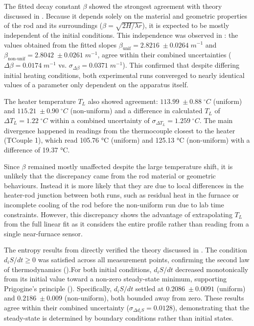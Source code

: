 \documentclass[11pt, a4paper, twocolumn]{article}
\begin{document}
The fitted decay constant $\beta$ showed the strongest agreement with theory discussed in . Because it depends solely on the material and geometric properties of the rod and its surroundings ($\beta=\sqrt{2H/\lambda r}$), it is expected to be mostly independent of the initial conditions. This independence was observed in : the values obtained from the fitted slopes $\beta_{\text{unif}} = 2.8216\;\pm 0.0264\; m^{-1}$ and $\beta_{\text{non-unif}} = 2.8042\;\pm 0.0261\; m^{-1}$, agree within their combined uncertainties ($\Delta \beta = 0.0174\;m^{-1}$ vs. $\sigma_{\Delta\beta}=0.0371\;m^{-1}$). This confirmed that despite differing initial heating conditions, both experimental runs convereged to nearly identical values of a parameter only dependent on the apparatus itself.

The heater temperature $T_L$ also showed agreement: $113.99\;\pm 0.88\; ^{\circ}C$ (uniform) and $115.21\;\pm 0.90\; ^{\circ}C$ (non-uniform) and a difference in calculated $T_L$ of $\Delta T_L = 1.22\;^{\circ}C$ within a combined uncertainty of $\sigma_{\Delta T_L}=1.259\;^{\circ}C$. The main divergence happened in readings from the thermocouple closest to the heater (TCouple 1), which read 105.76 °C (uniform) and 125.13 °C (non-uniform) with a difference of 19.37 °C.

Since $\beta$ remained mostly unaffected despite the large temperature shift, it is unlikely that the discrepancy came from the rod material or geometric behaviours. Instead it is more likely that they are due to local differences in the heater-rod junction between both runs, such as residual heat in the furnace or incomplete cooling of the rod before the non-uniform run due to lab time constraints. However, this discrepancy shows the advantage of extrapolating $T_L$ from the full linear fit as it considers the entire profile rather than reading from a single near-furnace sensor.

The entropy results from  directly verified the theory discussed in . The condition $d_iS/dt \ge 0$ was satisfied across all measurement points, confirming the second law of thermodynamics ().For both initial conditions, $d_iS/dt$ decreased monotonically from its initial value toward a non-zero steady-state minimum, supporting Prigogine's principle (). Specifically, $d_iS/dt$ settled at $0.2086\;\pm 0.0091$ (uniform) and $0.2186\;\pm 0.009$ (non-uniform), both bounded away from zero. These results agree within their combined uncertainty ($\sigma_{\Delta d_iS}=0.0128$), demonstrating that the steady-state is determined by boundary conditions rather than initial states.
\end{document}
